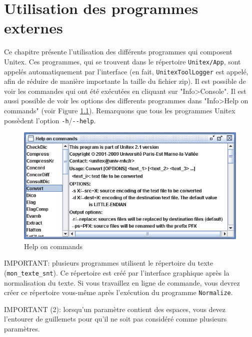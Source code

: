\chapter{Utilisation des programmes externes}
\label{chap-external-programs}
Ce chapitre présente l’utilisation des différents programmes qui composent Unitex. Ces
programmes, qui se trouvent dans le répertoire \verb+Unitex/App+, sont appelés automatiquement par
l'interface (en fait, \verb+UnitexToolLogger+ est appelé, afin de réduire de manière importante la taille du fichier zip).
Il est possible de voir les commandes qui ont été exécutées en cliquant sur  "Info>Console". Il est aussi possible de voir les options des differents programmes dans "Info>Help on commands" (voir Figure \ref{fig-help}). Remarquons que tous les programmes Unitex possèdent l'option \verb$-h$/\verb$--help$.

\bigskip
\begin{figure}[!h]
\begin{center}
\includegraphics[width=14cm]{resources/img/fig11-1.png}
\caption{Help on commands\label{fig-help}}
\end{center}
\end{figure}

\bigskip
\noindent IMPORTANT: plusieurs programmes utilisent le répertoire du texte (\verb+mon_texte_snt+).
Ce répertoire est créé par l’interface graphique après la normalisation du texte. Si vous travaillez en ligne de commande, vous devrez créer ce répertoire vous-même après l’exécution du programme
\verb+Normalize+.

\bigskip
\noindent IMPORTANT (2): lorsqu’un paramètre contient des espaces, vous devez l’entourer de
guillemets pour qu’il ne soit pas considéré comme plusieurs paramètres.


